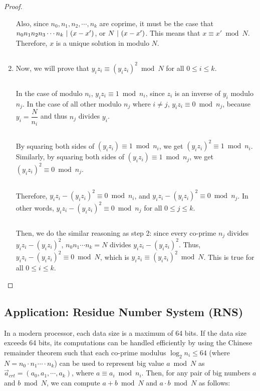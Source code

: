 \begin{proof}
\begin{enumerate}
Also, since $n_0, n_1, n_2, \cdots, n_k$ are coprime, it must be the case that $n_0n_1n_2n_3\cdots n_k \text{ } \text{$|$} \text{ } (x - x')$, or $N \text{ } \text{$|$} \text{ } (x - x')$. This means that $x \equiv x' \bmod N$. Therefore, $x$ is a unique solution in modulo $N$.

$ $

\item Now, we will prove that $y_iz_i \equiv (y_iz_i)^2 \bmod N$  \text{ } for all $0 \leq i \leq k$. 

$ $

In the case of modulo $n_i$, $y_iz_i \equiv 1 \bmod n_i$, since $z_i$ is an inverse of $y_i$ modulo $n_j$. In the case of all other modulo $n_j$ where $i \neq j$, $y_iz_i \equiv 0 \bmod n_j$, because $y_i = \dfrac{N}{n_i}$ and thus $n_j$ divides $y_i$. 

$ $

By squaring both sides of $(y_iz_i) \equiv 1 \bmod n_i$, we get $(y_iz_i)^2 \equiv 1 \bmod n_i$. Similarly, by squaring both sides of $(y_iz_i) \equiv 1 \bmod n_j$, we get $(y_iz_i)^2 \equiv 0 \bmod n_j$.

$ $

Therefore, $y_iz_i - (y_iz_i)^2 \equiv 0 \bmod n_i$, and $y_iz_i - (y_iz_i)^2 \equiv 0 \bmod n_j$. In other words, $y_iz_i - (y_iz_i)^2 \equiv 0 \bmod n_j$ for all $0 \leq j \leq k$. 

$ $

Then, we do the similar reasoning as step 2: since every co-prime $n_j$ divides $y_iz_i - (y_iz_i)^2$, $n_0n_1\cdots n_k = N$ divides $y_iz_i - (y_iz_i)^2$. Thus, $y_iz_i - (y_iz_i)^2 \equiv 0 \bmod N$, which is $y_iz_i \equiv (y_iz_i)^2 \bmod N$. This is true for all $0 \leq i \leq k$. 

\end{enumerate}

\end{proof}


\subsection{Application: Residue Number System (RNS)} 
\label{subsec:crt-application}

In a modern processor, each data size is a maximum of 64 bits. If the data size exceeds 64 bits, its computations can be handled efficiently by using the Chinese remainder theorem such that each co-prime modulus $\log_2n_i \leq 64$ (where $N = n_0\cdot n_1\cdots\cdot n_k$) can be used to represent big value $a \bmod N$ as $\vec{a}_{\mathit{crt}} = (a_0, a_1, \cdots , a_k)$, where $a \equiv a_i \bmod n_i$. Then, for any pair of big numbers $a$ and $b \bmod N$, we can compute $a + b \bmod N$ and $a \cdot b \bmod N$ as follows: 

